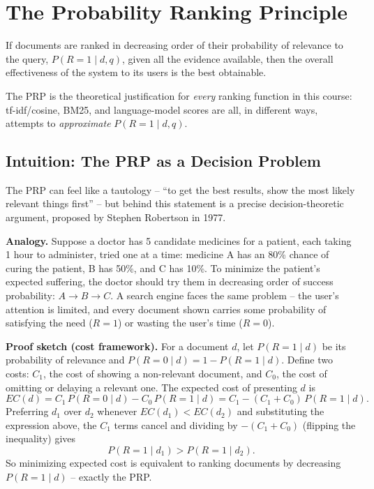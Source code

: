 \documentclass[11pt, a4paper]{article}
\begin{document}
\section{The Probability Ranking Principle}

\begin{defbox}
If documents are ranked in decreasing order of their probability of relevance to the query, $P(R=1\mid d,q)$, given all the evidence available, then the overall effectiveness of the system to its users is the best obtainable.
\end{defbox}

The PRP is the theoretical justification for \emph{every} ranking function in this course: tf-idf/cosine, BM25, and language-model scores are all, in different ways, attempts to \emph{approximate} $P(R=1\mid d,q)$.

\subsection{Intuition: The PRP as a Decision Problem}

The PRP can feel like a tautology -- ``to get the best results, show the most likely relevant things first'' -- but behind this statement is a precise decision-theoretic argument, proposed by Stephen Robertson in 1977.

\textbf{Analogy.} Suppose a doctor has 5 candidate medicines for a patient, each taking 1 hour to administer, tried one at a time: medicine A has an 80\% chance of curing the patient, B has 50\%, and C has 10\%. To minimize the patient's expected suffering, the doctor should try them in decreasing order of success probability: $A \to B \to C$. A search engine faces the same problem -- the user's attention is limited, and every document shown carries some probability of satisfying the need ($R=1$) or wasting the user's time ($R=0$).

\textbf{Proof sketch (cost framework).} For a document $d$, let $P(R=1\mid d)$ be its probability of relevance and $P(R=0\mid d) = 1-P(R=1\mid d)$. Define two costs: $C_1$, the cost of showing a non-relevant document, and $C_0$, the cost of omitting or delaying a relevant one. The expected cost of presenting $d$ is
\[
EC(d) = C_1\,P(R=0\mid d) - C_0\,P(R=1\mid d) = C_1 - (C_1+C_0)\,P(R=1\mid d).
\]
Preferring $d_1$ over $d_2$ whenever $EC(d_1) < EC(d_2)$ and substituting the expression above, the $C_1$ terms cancel and dividing by $-(C_1+C_0)$ (flipping the inequality) gives
\[
P(R=1\mid d_1) > P(R=1\mid d_2).
\]
So minimizing expected cost is equivalent to ranking documents by decreasing $P(R=1\mid d)$ -- exactly the PRP.
\end{document}
